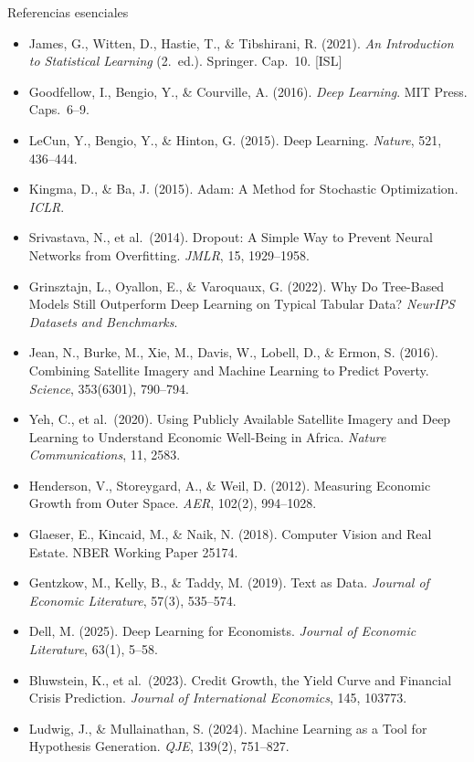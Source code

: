 \documentclass{beamer}
\newcommand{\1}{\mathbb{I}}
\begin{document}
\begin{frame}{Referencias esenciales}
\scriptsize
\begin{itemize}\itemsep0pt
  \item James, G., Witten, D., Hastie, T., \& Tibshirani, R. (2021). \emph{An Introduction to Statistical Learning} (2.\ ed.). Springer. Cap.\ 10. [ISL]
  \item Goodfellow, I., Bengio, Y., \& Courville, A. (2016). \emph{Deep Learning}. MIT Press. Caps.\ 6--9.
  \item LeCun, Y., Bengio, Y., \& Hinton, G. (2015). Deep Learning. \emph{Nature}, 521, 436--444.
  \item Kingma, D., \& Ba, J. (2015). Adam: A Method for Stochastic Optimization. \emph{ICLR}.
  \item Srivastava, N., et al.\ (2014). Dropout: A Simple Way to Prevent Neural Networks from Overfitting. \emph{JMLR}, 15, 1929--1958.
  \item Grinsztajn, L., Oyallon, E., \& Varoquaux, G. (2022). Why Do Tree-Based Models Still Outperform Deep Learning on Typical Tabular Data? \emph{NeurIPS Datasets and Benchmarks}.
  \item Jean, N., Burke, M., Xie, M., Davis, W., Lobell, D., \& Ermon, S. (2016). Combining Satellite Imagery and Machine Learning to Predict Poverty. \emph{Science}, 353(6301), 790--794.
  \item Yeh, C., et al.\ (2020). Using Publicly Available Satellite Imagery and Deep Learning to Understand Economic Well-Being in Africa. \emph{Nature Communications}, 11, 2583.
  \item Henderson, V., Storeygard, A., \& Weil, D. (2012). Measuring Economic Growth from Outer Space. \emph{AER}, 102(2), 994--1028.
  \item Glaeser, E., Kincaid, M., \& Naik, N. (2018). Computer Vision and Real Estate. NBER Working Paper 25174.
  \item Gentzkow, M., Kelly, B., \& Taddy, M. (2019). Text as Data. \emph{Journal of Economic Literature}, 57(3), 535--574.
  \item Dell, M. (2025). Deep Learning for Economists. \emph{Journal of Economic Literature}, 63(1), 5--58.
  \item Bluwstein, K., et al.\ (2023). Credit Growth, the Yield Curve and Financial Crisis Prediction. \emph{Journal of International Economics}, 145, 103773.
  \item Ludwig, J., \& Mullainathan, S. (2024). Machine Learning as a Tool for Hypothesis Generation. \emph{QJE}, 139(2), 751--827.
\end{itemize}
\normalsize
\end{frame}
\end{document}
